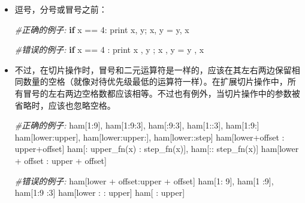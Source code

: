 \documentclass[ignorenonframetext,9pt]{beamer}
\newenvironment{Shaded}{}{}
\newcommand{\BuiltInTok}[1]{#1}
\newcommand{\CommentTok}[1]{\textcolor[rgb]{0.38,0.63,0.69}{\textit{#1}}}
\newcommand{\ControlFlowTok}[1]{\textcolor[rgb]{0.00,0.44,0.13}{\textbf{#1}}}
\newcommand{\DecValTok}[1]{\textcolor[rgb]{0.25,0.63,0.44}{#1}}
\newcommand{\NormalTok}[1]{#1}
\newcommand{\OperatorTok}[1]{\textcolor[rgb]{0.40,0.40,0.40}{#1}}
\begin{document}
\begin{frame}[fragile]
\begin{block}{}
\begin{itemize}
\item
  逗号，分号或冒号之前：

\begin{Shaded}
\begin{Highlighting}[]
\CommentTok{#正确的例子:}
\ControlFlowTok{if}\NormalTok{ x }\OperatorTok{==} \DecValTok{4}\NormalTok{: }\BuiltInTok{print}\NormalTok{ x, y}\OperatorTok{;}\NormalTok{ x, y }\OperatorTok{=}\NormalTok{ y, x}

\CommentTok{#错误的例子:}
\ControlFlowTok{if}\NormalTok{ x }\OperatorTok{==} \DecValTok{4}\NormalTok{ : }\BuiltInTok{print}\NormalTok{ x , y }\OperatorTok{;}\NormalTok{ x , y }\OperatorTok{=}\NormalTok{ y , x}
\end{Highlighting}
\end{Shaded}
\end{itemize}

\end{block}

\end{frame}

\begin{frame}[fragile]

\begin{itemize}
\item
  不过，在切片操作时，冒号和二元运算符是一样的，应该在其左右两边保留相同数量的空格（就像对待优先级最低的运算符一样）。在扩展切片操作中，所有冒号的左右两边空格数都应该相等。不过也有例外，当切片操作中的参数被省略时，应该也忽略空格。

\begin{Shaded}
\begin{Highlighting}[]
\CommentTok{#正确的例子:}
\NormalTok{ham[}\DecValTok{1}\NormalTok{:}\DecValTok{9}\NormalTok{], ham[}\DecValTok{1}\NormalTok{:}\DecValTok{9}\NormalTok{:}\DecValTok{3}\NormalTok{], ham[:}\DecValTok{9}\NormalTok{:}\DecValTok{3}\NormalTok{], ham[}\DecValTok{1}\NormalTok{::}\DecValTok{3}\NormalTok{], ham[}\DecValTok{1}\NormalTok{:}\DecValTok{9}\NormalTok{:]}
\NormalTok{ham[lower:upper], ham[lower:upper:], ham[lower::step]}
\NormalTok{ham[lower}\OperatorTok{+}\NormalTok{offset : upper}\OperatorTok{+}\NormalTok{offset]}
\NormalTok{ham[: upper_fn(x) : step_fn(x)], ham[:: step_fn(x)]}
\NormalTok{ham[lower }\OperatorTok{+}\NormalTok{ offset : upper }\OperatorTok{+}\NormalTok{ offset]}

\CommentTok{#错误的例子:}
\NormalTok{ham[lower }\OperatorTok{+}\NormalTok{ offset:upper }\OperatorTok{+}\NormalTok{ offset]}
\NormalTok{ham[}\DecValTok{1}\NormalTok{: }\DecValTok{9}\NormalTok{], ham[}\DecValTok{1}\NormalTok{ :}\DecValTok{9}\NormalTok{], ham[}\DecValTok{1}\NormalTok{:}\DecValTok{9}\NormalTok{ :}\DecValTok{3}\NormalTok{]}
\NormalTok{ham[lower : : upper]}
\NormalTok{ham[ : upper]}
\end{Highlighting}
\end{Shaded}
\end{itemize}

\end{frame}
\end{document}
